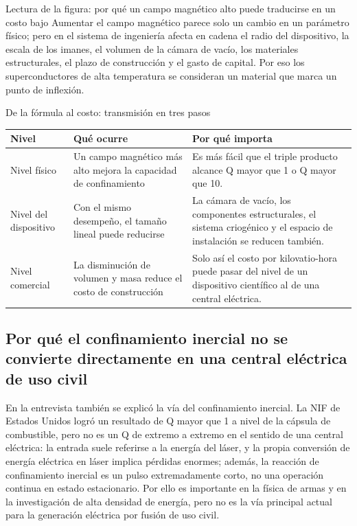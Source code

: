 \documentclass[a4paper]{article}
\begin{document}
\begin{knowledgebox}{Lectura de la figura: por qué un campo magnético alto puede traducirse en un costo bajo}
Aumentar el campo magnético parece solo un cambio en un parámetro físico; pero en el sistema de ingeniería afecta en cadena el radio del dispositivo, la escala de los imanes, el volumen de la cámara de vacío, los materiales estructurales, el plazo de construcción y el gasto de capital. Por eso los superconductores de alta temperatura se consideran un material que marca un punto de inflexión.
\end{knowledgebox}

\begin{knowledgebox}{De la fórmula al costo: transmisión en tres pasos}
\begin{tabularx}{\textwidth}{p{}p{}X}
\toprule
Nivel & Qué ocurre & Por qué importa \\
\midrule
Nivel físico & Un campo magnético más alto mejora la capacidad de confinamiento & Es más fácil que el triple producto alcance Q mayor que 1 o Q mayor que 10. \\
Nivel del dispositivo & Con el mismo desempeño, el tamaño lineal puede reducirse & La cámara de vacío, los componentes estructurales, el sistema criogénico y el espacio de instalación se reducen también. \\
Nivel comercial & La disminución de volumen y masa reduce el costo de construcción & Solo así el costo por kilovatio-hora puede pasar del nivel de un dispositivo científico al de una central eléctrica. \\
\bottomrule
\end{tabularx}
\end{knowledgebox}

\subsection{Por qué el confinamiento inercial no se convierte directamente en una central eléctrica de uso civil}

En la entrevista también se explicó la vía del confinamiento inercial. La NIF de Estados Unidos logró un resultado de Q mayor que 1 a nivel de la cápsula de combustible, pero no es un Q de extremo a extremo en el sentido de una central eléctrica: la entrada suele referirse a la energía del láser, y la propia conversión de energía eléctrica en láser implica pérdidas enormes; además, la reacción de confinamiento inercial es un pulso extremadamente corto, no una operación continua en estado estacionario. Por ello es importante en la física de armas y en la investigación de alta densidad de energía, pero no es la vía principal actual para la generación eléctrica por fusión de uso civil.
\end{document}

